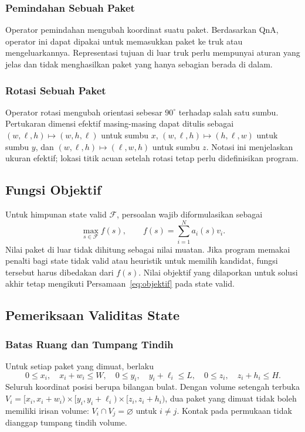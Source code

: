 \subsubsection{Pemindahan Sebuah Paket}
Operator pemindahan mengubah koordinat suatu paket. Berdasarkan QnA, operator
ini dapat dipakai untuk memasukkan paket ke truk atau mengeluarkannya.
Representasi tujuan di luar truk perlu mempunyai aturan yang jelas dan tidak
menghasilkan paket yang hanya sebagian berada di dalam.

\subsubsection{Rotasi Sebuah Paket}
Operator rotasi mengubah orientasi sebesar $90^\circ$ terhadap salah satu
sumbu. Pertukaran dimensi efektif masing-masing dapat ditulis sebagai
$(w,\ell,h)\mapsto(w,h,\ell)$ untuk sumbu $x$,
$(w,\ell,h)\mapsto(h,\ell,w)$ untuk sumbu $y$, dan
$(w,\ell,h)\mapsto(\ell,w,h)$ untuk sumbu $z$. Notasi ini menjelaskan ukuran
efektif; lokasi titik acuan setelah rotasi tetap perlu didefinisikan program.


\subsection{Fungsi Objektif}
Untuk himpunan state valid $\mathcal{F}$, persoalan wajib diformulasikan sebagai
\begin{equation}
 \max_{s\in\mathcal{F}} f(s),\qquad
 f(s)=\sum_{i=1}^{N}a_i(s)v_i.\label{eq:objektif}
\end{equation}
Nilai paket di luar tidak dihitung sebagai nilai muatan. Jika program memakai
penalti bagi state tidak valid atau heuristik untuk memilih kandidat, fungsi
tersebut harus dibedakan dari $f(s)$. Nilai objektif yang dilaporkan untuk
solusi akhir tetap mengikuti Persamaan~\eqref{eq:objektif} pada state valid.

\subsection{Pemeriksaan Validitas State}\label{sec:validasi}
\subsubsection{Batas Ruang dan Tumpang Tindih}
Untuk setiap paket yang dimuat, berlaku
\begin{equation}
 0\leq x_i,\quad x_i+w_i\leq W,\quad
 0\leq y_i,\quad y_i+\ell_i\leq L,\quad
 0\leq z_i,\quad z_i+h_i\leq H.
\end{equation}
Seluruh koordinat posisi berupa bilangan bulat. Dengan volume setengah
terbuka $V_i=[x_i,x_i+w_i)\times[y_i,y_i+\ell_i)\times[z_i,z_i+h_i)$,
dua paket yang dimuat tidak boleh memiliki irisan volume:
$V_i\cap V_j=\varnothing$ untuk $i\ne j$. Kontak pada permukaan tidak
dianggap tumpang tindih volume.


